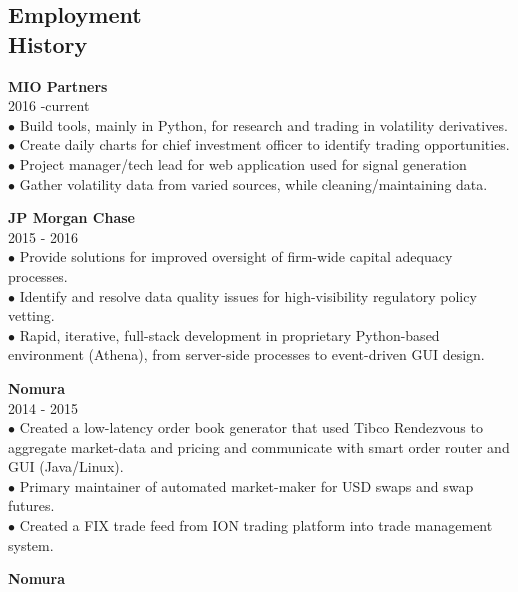\documentclass[margin]{res}
\begin{document}
\begin{resume}
\section{\helv Employment\\ History}
\begin{list1}
\item {\bf MIO Partners}\\
2016 -current\\[0.05cm]
$\bullet$ Build tools, mainly in Python, for research and trading in volatility derivatives. \\[0.05cm]
$\bullet$ Create daily charts for chief investment officer to identify trading opportunities. \\[0.05cm]
$\bullet$ Project manager/tech lead for web application used for signal generation\\[0.05cm]
$\bullet$ Gather volatility data from varied sources, while cleaning/maintaining data.
\vspace{0.1cm}
\item {\bf JP Morgan Chase}\\[0.05cm]
2015 - 2016\\[0.05cm]
$\bullet$ Provide solutions for improved oversight of firm-wide capital adequacy processes. \\[0.05cm]
$\bullet$ Identify and resolve data quality issues for high-visibility regulatory policy vetting.\\[0.05cm]
$\bullet$ Rapid, iterative, full-stack development in proprietary Python-based environment (Athena), from server-side processes to event-driven GUI design.
\vspace{0.1cm}
\item {\bf Nomura }\\ 
2014 - 2015 \\[0.05cm]
$\bullet$ Created a low-latency order book generator that used Tibco Rendezvous to aggregate market-data and pricing and communicate with smart order router and GUI (Java/Linux). \\[0.05cm]
$\bullet$ Primary maintainer of  automated market-maker for USD swaps and swap futures.\\[0.05cm]
$\bullet$ Created a FIX trade feed from ION trading platform into trade management system.
\vspace{0.1cm}
\item {\bf Nomura}\\

\end{list1}
\end{resume}
\end{document}
